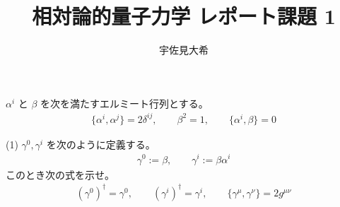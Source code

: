 \documentclass[uplatex,dvipdfmx,a4paper,11pt]{jlreq}
\title{相対論的量子力学 レポート課題 1}
\author{宇佐見大希}
\theoremstyle{definition}
\begin{document}
\maketitle

\begin{problem}
$\alpha^i$ と $\beta$ を次を満たすエルミート行列とする。
\begin{align}
  \lbrace\alpha^i,\alpha^j\rbrace = 2\delta^{ij}, \qquad \beta^2 = 1, \qquad \lbrace\alpha^i,\beta\rbrace = 0 \label{condition}
\end{align}
\end{problem}
(1) $\gamma^0, \gamma^i$ を次のように定義する。
\begin{align}
  \gamma^0 := \beta, \qquad \gamma^i := \beta\alpha^i
\end{align}
このとき次の式を示せ。
\begin{align}
  (\gamma^0)^\dagger = \gamma^0, \qquad (\gamma^i)^\dagger = \gamma^i, \qquad \lbrace\gamma^\mu, \gamma^\nu\rbrace = 2g^{\mu\nu}
\end{align}
\end{document}
